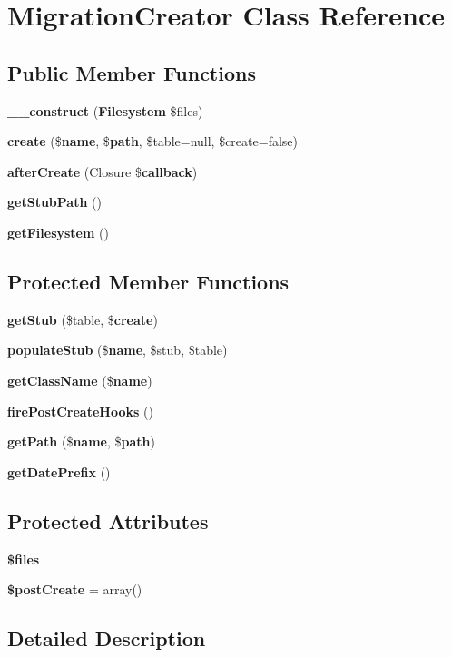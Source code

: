 \section{Migration\+Creator Class Reference}
\label{class_illuminate_1_1_database_1_1_migrations_1_1_migration_creator}
\subsection*{Public Member Functions}
\begin{DoxyCompactItemize}
\item 
{\bf \+\_\+\+\_\+construct} ({\bf Filesystem} \$files)
\item 
{\bf create} (\${\bf name}, \${\bf path}, \$table=null, \$create=false)
\item 
{\bf after\+Create} (Closure \${\bf callback})
\item 
{\bf get\+Stub\+Path} ()
\item 
{\bf get\+Filesystem} ()
\end{DoxyCompactItemize}
\subsection*{Protected Member Functions}
\begin{DoxyCompactItemize}
\item 
{\bf get\+Stub} (\$table, \${\bf create})
\item 
{\bf populate\+Stub} (\${\bf name}, \$stub, \$table)
\item 
{\bf get\+Class\+Name} (\${\bf name})
\item 
{\bf fire\+Post\+Create\+Hooks} ()
\item 
{\bf get\+Path} (\${\bf name}, \${\bf path})
\item 
{\bf get\+Date\+Prefix} ()
\end{DoxyCompactItemize}
\subsection*{Protected Attributes}
\begin{DoxyCompactItemize}
\item 
{\bf \$files}
\item 
{\bf \$post\+Create} = array()
\end{DoxyCompactItemize}


\subsection{Detailed Description}


